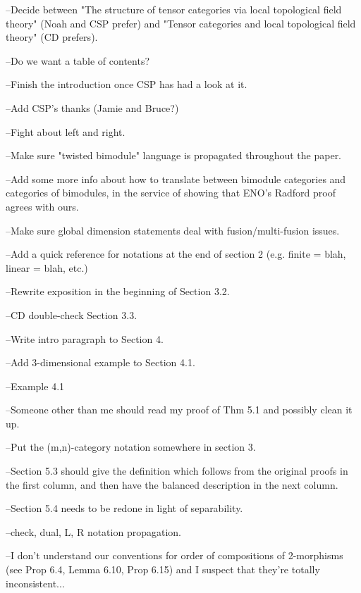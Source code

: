 --Decide between "The structure of tensor categories via local topological field theory" (Noah and CSP prefer) and "Tensor categories and local topological field theory" (CD prefers).

--Do we want a table of contents?

--Finish the introduction once CSP has had a look at it.

--Add CSP's thanks (Jamie and Bruce?)

--Fight about left and right.

--Make sure "twisted bimodule" language is propagated throughout the paper.

--Add some more info about how to translate between bimodule categories and categories of bimodules, in the service of showing that ENO's Radford proof agrees with ours.

--Make sure global dimension statements deal with fusion/multi-fusion issues.

--Add a quick reference for notations at the end of section 2 (e.g. finite = blah, linear = blah, etc.)

--Rewrite exposition in the beginning of Section 3.2.

--CD double-check Section 3.3.

--Write intro paragraph to Section 4.

--Add 3-dimensional example to Section 4.1.

--Example 4.1

--Someone other than me should read my proof of Thm 5.1 and possibly clean it up.

--Put the (m,n)-category notation somewhere in section 3.

--Section 5.3 should give the definition which follows from the original proofs in the first column, and then have the balanced description in the next column.

--Section 5.4 needs to be redone in light of separability.

--check, dual, L, R notation propagation.

--I don't understand our conventions for order of compositions of 2-morphisms (see Prop 6.4, Lemma 6.10, Prop 6.15) and I suspect that they're totally inconsistent...